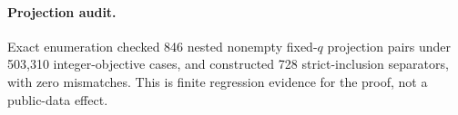 \paragraph{Projection audit.} Exact enumeration checked 846 nested nonempty fixed-$q$ projection pairs under 503,310 integer-objective cases, and constructed 728 strict-inclusion separators, with zero mismatches. This is finite regression evidence for the proof, not a public-data effect.
